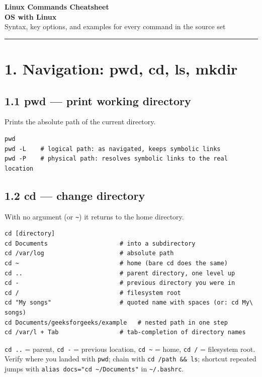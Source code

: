 \documentclass[11pt,a4paper]{article}
\newcommand{\cmd}[1]{\texttt{#1}}
\begin{document}
\begin{center}
{\Huge\bfseries\color{navy} Linux Commands Cheatsheet}\\[4pt]
{\LARGE\bfseries OS with Linux}\\[8pt]
{\large Syntax, key options, and examples for every command in the source set}\\[10pt]
\rule{0.85\textwidth}{0.6pt}
\end{center}

\tableofcontents

\newpage

\section{1. Navigation: pwd, cd, ls, mkdir}

\subsection{1.1 pwd --- print working directory}
Prints the absolute path of the current directory.
\begin{lstlisting}
pwd
pwd -L    # logical path: as navigated, keeps symbolic links
pwd -P    # physical path: resolves symbolic links to the real location
\end{lstlisting}

\subsection{1.2 cd --- change directory}
With no argument (or \cmd{\textasciitilde}) it returns to the home directory.
\begin{lstlisting}
cd [directory]
cd Documents                    # into a subdirectory
cd /var/log                     # absolute path
cd ~                            # home (bare cd does the same)
cd ..                           # parent directory, one level up
cd -                            # previous directory you were in
cd /                            # filesystem root
cd "My songs"                   # quoted name with spaces (or: cd My\ songs)
cd Documents/geeksforgeeks/example   # nested path in one step
cd /var/l + Tab                 # tab-completion of directory names
\end{lstlisting}
\cmd{cd ..} = parent, \cmd{cd -} = previous location, \cmd{cd \textasciitilde} = home, \cmd{cd /} = filesystem root. Verify where you landed with \cmd{pwd}; chain with \cmd{cd /path \&\& ls}; shortcut repeated jumps with \cmd{alias docs="cd \textasciitilde/Documents"} in \cmd{\textasciitilde/.bashrc}.
\end{document}
